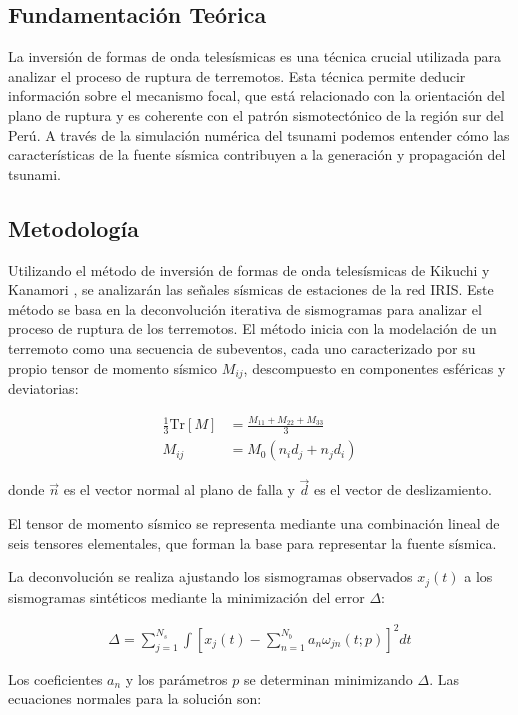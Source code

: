 \documentclass[spanish,a4paper,11pt]{article}
\begin{document}
\subsection{Fundamentación Teórica} 
La inversión de formas de onda telesísmicas es una técnica crucial utilizada para analizar el proceso de ruptura de terremotos. Esta técnica permite deducir información sobre el mecanismo focal, que está relacionado con la orientación del plano de ruptura y es coherente con el patrón sismotectónico de la región sur del Perú. A través de la simulación numérica del tsunami podemos entender cómo las características de la fuente sísmica contribuyen a la generación y propagación del tsunami.

\subsection{Metodología} 
Utilizando el método de inversión de formas de onda telesísmicas de Kikuchi y Kanamori \cite{Kik2003}, se analizarán las señales sísmicas de estaciones de la red IRIS. Este método se basa en la deconvolución iterativa de sismogramas para analizar el proceso de ruptura de los terremotos. El método inicia con la modelación de un terremoto como una secuencia de subeventos, cada uno caracterizado por su propio tensor de momento sísmico \( M_{ij} \), descompuesto en componentes esféricas y deviatorias:

\begin{align}
  \frac{1}{3} \text{Tr}[M] & = \frac{M_{11} + M_{22} + M_{33}}{3}\\
  M_{ij} &= M_0(n_i d_j + n_j d_i)
\end{align}

donde \( \vec{n} \) es el vector normal al plano de falla y \( \vec{d} \) es el vector de deslizamiento.

El tensor de momento sísmico se representa mediante una combinación lineal de seis tensores elementales, que forman la base para representar la fuente sísmica.

La deconvolución se realiza ajustando los sismogramas observados \( x_j(t) \) a los sismogramas sintéticos mediante la minimización del error \( \Delta \):

\begin{align}
    \Delta = \sum_{j=1}^{N_s} \int \left[ x_j(t) - \sum_{n=1}^{N_b} a_n \omega_{jn}(t; p) \right]^2 dt
\end{align}

Los coeficientes \( a_n \) y los parámetros \( p \) se determinan minimizando \( \Delta \). Las ecuaciones normales para la solución son:
\end{document}
